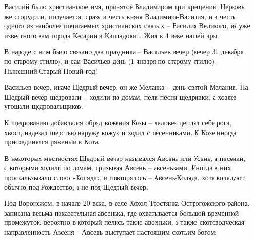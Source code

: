 \documentclass[a5paper,11pt,openany]{article}
\begin{document}
  Василий было христианское имя, принятое Владимиром при крещении. Церковь же соорудили, получается, сразу в честь князя Владимира-Василия, и в честь одного из наиболее почитаемых христианских святых – Василия Великого, из уже известного вам города Кесарии в Каппадокии. Жил в 4 веке нашей эры.

 В народе с ним было связано два праздника – Васильев вечер (вечер 31 декабря по старому стилю), и сам Васильев день (1 января по старому стилю). Нынешний Старый Новый год!

  Васильев вечер, иначе Щедрый вечер, он же Меланка – день святой Мелании. На Щедрый вечер щедровали – ходили по домам, пели песни-щедривки, а хозяев угощали щедровальщиков.

К щедрованию добавлялся обряд вожения Козы – человек цеплял себе рога, хвост, надевал шерстью наружу кожух и ходил с песенниками. К Козе иногда присоединялся ряженый в Кота.

В некоторых местностях Щедрый вечер назывался Авсень или Усень, а песенки, с которыми ходили по домам, призывая Авсень – авсеньками. Иногда в них проскальзывало слово «Коляда», и повторялось – Авсень-Коляда, хотя колядуют обычно под Рождество, а не под Щедрый вечер. 

Под Воронежом, в начале 20 века, в селе Хохол-Тростянка Острогожского района, записана\cite[143]{afsb03} весьма показательная авсенька, где охватывается большой временной промежуток, вероятно в который пелись такие авсеньки, а также скотоводческая направленность Авсеня – Авсень выступает настоящим скотьим богом:
\end{document}
